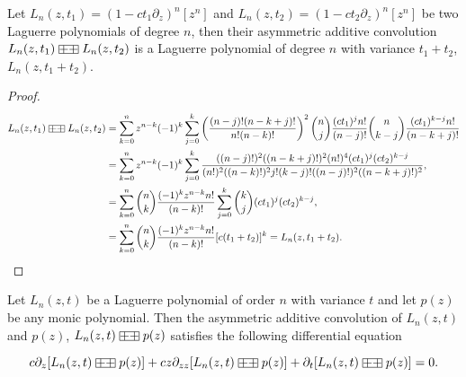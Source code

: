 \begin{theorem}
    Let $L_n(z,t_1) = (1-ct_1\partial_z)^n[z^n]$ and $L_n(z,t_2) = (1-ct_2\partial_z)^n[z^n]$ be two Laguerre polynomials of degree $n$, then their asymmetric additive convolution $L_n(z,t_1) \aac L_n(z,t_2)$ is a Laguerre polynomial of degree $n$ with variance $t_1+t_2$, $L_n(z,t_1+t_2)$. 
\end{theorem}

\begin{proof}
    \begin{align*}
        L_n(z,t_1) \aac L_n(z,t_2) &= \sum_{k=0}^n z^{n-k}(-1)^k \sum_{j=0}^k \left(\frac{(n-j)!(n-k+j)!}{n!(n-k)!}\right)^2\binom{n}{j}\frac{(ct_1)^jn!}{(n-j)!}\binom{n}{k-j}\frac{(ct_1)^{k-j} n!}{(n-k+j)!}\\ 
        &= \sum_{k=0}^n z^{n-k}(-1)^k \sum_{j=0}^k \frac{((n-j)!)^2((n-k+j)!)^2(n!)^4(ct_1)^j(ct_2)^{k-j}}{(n!)^2((n-k)!)^2j!(k-j)!((n-j)!)^2((n-k+j)!)^2},\\ 
        &= \sum_{k=0}^n \binom{n}{k} \frac{(-1)^k z^{n-k}n!}{(n-k)!}\sum_{j=0}^k \binom{k}{j}(ct_1)^j(ct_2)^{k-j}, \\  
        &=  \sum_{k=0}^n \binom{n}{k} \frac{(-1)^k z^{n-k}n!}{(n-k)!}[c(t_1 + t_2)]^k = L_n(z,t_1 + t_2).
    \end{align*}
\end{proof}

\begin{theorem}
    Let $L_n(z,t)$ be a Laguerre polynomial of order $n$ with variance $t$ and let $p(z)$ be any monic polynomial. Then the asymmetric additive convolution of $L_n(z,t)$ and $p(z)$, $L_n(z,t) \aac p(z)$ satisfies the following differential equation

    \begin{equation*}
        c\partial_z [L_n(z,t) \aac p(z)] + cz \partial_{zz}[L_n(z,t) \aac p(z)] + \partial_t [L_n(z,t) \aac p(z)] = 0.
    \end{equation*}
\end{theorem}

